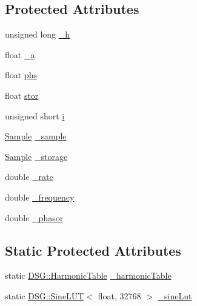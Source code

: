\subsection*{Protected Attributes}
\begin{DoxyCompactItemize}
\item 
unsigned long \hyperlink{classDSG_1_1FourierSquare_a2b82df6091ad654fe59a44ff6e18a363}{\+\_\+h}
\item 
float \hyperlink{classDSG_1_1FourierSquare_adf625daced0977db90522ba9f4519f91}{\+\_\+a}
\item 
float \hyperlink{classDSG_1_1FourierSquare_a49d0e6f221e67139d47f68c7e4b9b1a9}{phs}
\item 
float \hyperlink{classDSG_1_1FourierSquare_a82bb1d630438aa3ca1d3b1264b8196a5}{stor}
\item 
unsigned short \hyperlink{classDSG_1_1FourierSquare_a4d191ba0c4aad4946cc60f90b7c48d88}{i}
\item 
\hyperlink{classDSG_1_1Sample}{Sample} \hyperlink{classDSG_1_1FourierGenerator_ab96bed1cd59c42e82a689036e5c62bef}{\+\_\+sample}
\item 
\hyperlink{classDSG_1_1Sample}{Sample} \hyperlink{classDSG_1_1FourierGenerator_a6b7f2439b26914cc9df6b6975a2cedac}{\+\_\+storage}
\item 
double \hyperlink{classDSG_1_1SignalGenerator_aa10f6c85d9adee901139ea7fb346f39d}{\+\_\+rate}
\item 
double \hyperlink{classDSG_1_1SignalGenerator_a67e296e3506dcdf09402c667cddff9ac}{\+\_\+frequency}
\item 
double \hyperlink{classDSG_1_1SignalGenerator_ac2271b582bf699275f077ecb642a8cd9}{\+\_\+phasor}
\end{DoxyCompactItemize}
\subsection*{Static Protected Attributes}
\begin{DoxyCompactItemize}
\item 
static \hyperlink{classDSG_1_1HarmonicTable}{D\+S\+G\+::\+Harmonic\+Table} \hyperlink{classDSG_1_1FourierGenerator_a7288408f8e44d5edb5eecc62480243d7}{\+\_\+harmonic\+Table}
\item 
static \hyperlink{classDSG_1_1SineLUT}{D\+S\+G\+::\+Sine\+L\+U\+T}$<$ float, 32768 $>$ \hyperlink{classDSG_1_1FourierGenerator_a1ae5fb243ce05e638bdf0dec8bde7426}{\+\_\+sine\+Lut}
\end{DoxyCompactItemize}


